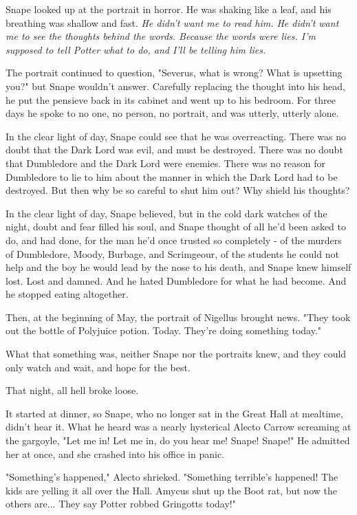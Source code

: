 Snape looked up at the portrait in horror. He was shaking like a leaf, and his breathing was shallow and fast. \emph{He didn't want me to read him. He didn't want me to see the thoughts behind the words. Because the words were lies. I'm supposed to tell Potter what to do, and I'll be telling him lies.}

The portrait continued to question, "Severus, what is wrong? What is upsetting you?" but Snape wouldn't answer. Carefully replacing the thought into his head, he put the pensieve back in its cabinet and went up to his bedroom. For three days he spoke to no one, no person, no portrait, and was utterly, utterly alone.

In the clear light of day, Snape could see that he was overreacting. There was no doubt that the Dark Lord was evil, and must be destroyed. There was no doubt that Dumbledore and the Dark Lord were enemies. There was no reason for Dumbledore to lie to him about the manner in which the Dark Lord had to be destroyed. But then why be so careful to shut him out? Why shield his thoughts?

In the clear light of day, Snape believed, but in the cold dark watches of the night, doubt and fear filled his soul, and Snape thought of all he'd been asked to do, and had done, for the man he'd once trusted so completely - of the murders of Dumbledore, Moody, Burbage, and Scrimgeour, of the students he could not help and the boy he would lead by the nose to his death, and Snape knew himself lost. Lost and damned. And he hated Dumbledore for what he had become. And he stopped eating altogether.

Then, at the beginning of May, the portrait of Nigellus brought news. "They took out the bottle of Polyjuice potion. Today. They're doing something today."

What that something was, neither Snape nor the portraits knew, and they could only watch and wait, and hope for the best.

That night, all hell broke loose.

It started at dinner, so Snape, who no longer sat in the Great Hall at mealtime, didn't hear it. What he heard was a nearly hysterical Alecto Carrow screaming at the gargoyle, "Let me in! Let me in, do you hear me! Snape! Snape!" He admitted her at once, and she crashed into his office in panic.

"Something's happened," Alecto shrieked. "Something terrible's happened! The kids are yelling it all over the Hall. Amycus shut up the Boot rat, but now the others are... They say Potter robbed Gringotts today!"

